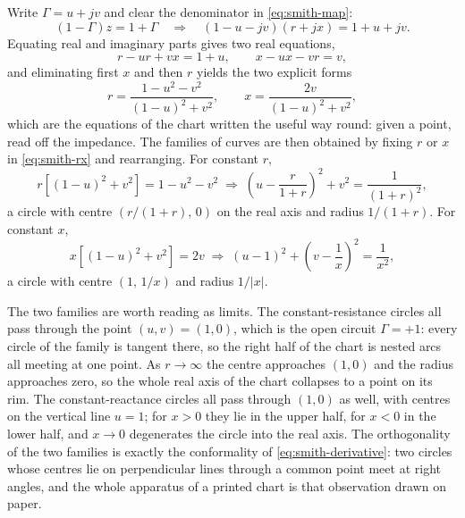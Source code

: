 Write $\Gamma=u+jv$ and clear the denominator in \eqref{eq:smith-map}:
\begin{equation}
  (1-\Gamma) z = 1+\Gamma
  \quad\Longrightarrow\quad
  (1-u-jv)(r+jx) = 1+u+jv .
  \label{eq:smith-clear}
\end{equation}
Equating real and imaginary parts gives two real equations,
\begin{equation}
  r - ur + vx = 1+u ,
  \qquad
  x - ux - vr = v ,
  \label{eq:smith-twoeq}
\end{equation}
and eliminating first $x$ and then $r$ yields the two explicit forms
\begin{equation}
  r = \frac{1-u^2-v^2}{(1-u)^2+v^2},
  \qquad
  x = \frac{2v}{(1-u)^2+v^2} ,
  \label{eq:smith-rx}
\end{equation}
which are the equations of the chart written the useful way round: given a point, read off the impedance.
The families of curves are then obtained by fixing $r$ or $x$ in \eqref{eq:smith-rx} and rearranging. For
constant $r$,
\begin{equation}
  r\left[(1-u)^2+v^2\right] = 1-u^2-v^2
  \;\Longrightarrow\;
  \left(u - \frac{r}{1+r}\right)^2 + v^2 = \frac{1}{(1+r)^2} ,
  \label{eq:smith-rcircle}
\end{equation}
a circle with centre $\left(r/(1+r),\,0\right)$ on the real axis and radius $1/(1+r)$. For constant $x$,
\begin{equation}
  x\left[(1-u)^2+v^2\right] = 2v
  \;\Longrightarrow\;
  (u-1)^2 + \left(v - \frac{1}{x}\right)^2 = \frac{1}{x^2} ,
  \label{eq:smith-xcircle}
\end{equation}
a circle with centre $\left(1,\,1/x\right)$ and radius $1/|x|$.

The two families are worth reading as limits. The constant-resistance circles all pass through the point
$(u,v)=(1,0)$, which is the open circuit $\Gamma=+1$: every circle of the family is tangent there, so the right
half of the chart is nested arcs all meeting at one point. As $r\to\infty$ the centre approaches $(1,0)$ and the
radius approaches zero, so the whole real axis of the chart collapses to a point on its rim. The
constant-reactance circles all pass through $(1,0)$ as well, with centres on the vertical line $u=1$; for
$x>0$ they lie in the upper half, for $x<0$ in the lower half, and $x\to0$ degenerates the circle into the real
axis. The orthogonality of the two families is exactly the conformality of \eqref{eq:smith-derivative}: two
circles whose centres lie on perpendicular lines through a common point meet at right angles, and the whole
apparatus of a printed chart is that observation drawn on paper.

